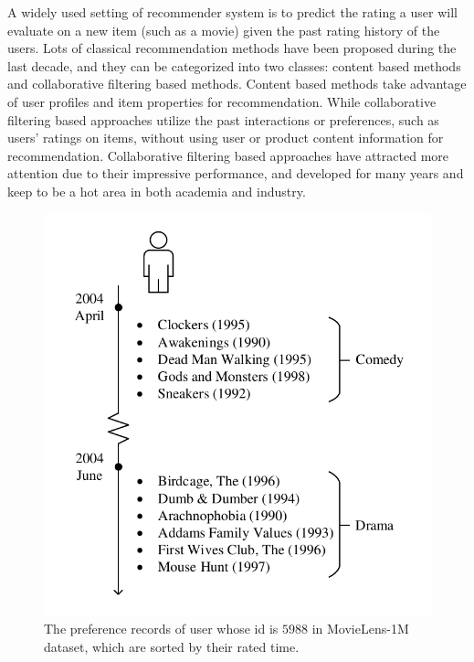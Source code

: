 \documentclass{sig-alternate-05-2015}
\begin{document}
A widely used setting of recommender system \cite{ricci2011introduction} is to
predict the rating a user will evaluate on a new item (such as a movie)
given the past rating history of the users.
Lots of classical recommendation methods have been proposed
during the last decade, and they can be categorized into two classes:
content based methods and collaborative filtering based methods.
Content based methods \cite{pazzani2007content} take advantage of
user profiles and item properties for recommendation.
While collaborative filtering based approaches \cite{su2009survey} utilize
the past interactions or preferences, such as users' ratings on items,
without using user or product content information for recommendation.
Collaborative filtering based approaches have attracted more attention
due to their impressive performance, and developed for many years and
keep to be a hot area in both academia and industry.

\begin{figure}[htbp]
    \centering
    \includegraphics[scale=0.7]{images/example.pdf}
    \caption{The preference records of user whose id is $5988$ in MovieLens-1M dataset,
    which are sorted by their rated time.}
    \label{fig:example}
\end{figure}
\end{document}
